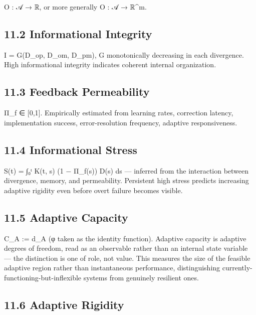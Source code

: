 \documentclass[
]{article}
\begin{document}
O : 𝒜 → ℝ, or more generally O : 𝒜 → ℝ\^{}m.

\hypertarget{informational-integrity-1}{%
\subsection{11.2 Informational
Integrity}\label{informational-integrity-1}}

I = G(D\_op, D\_om, D\_pm), G monotonically decreasing in each
divergence. High informational integrity indicates coherent internal
organization.

\hypertarget{feedback-permeability-1}{%
\subsection{11.3 Feedback Permeability}\label{feedback-permeability-1}}

Π\_f ∈ {[}0,1{]}. Empirically estimated from learning rates, correction
latency, implementation success, error-resolution frequency, adaptive
responsiveness.

\hypertarget{informational-stress-1}{%
\subsection{11.4 Informational Stress}\label{informational-stress-1}}

S(t) = ∫₀ᵗ K(t, s) (1 − Π\_f(s)) D(s) ds --- inferred from the
interaction between divergence, memory, and permeability. Persistent
high stress predicts increasing adaptive rigidity even before overt
failure becomes visible.

\hypertarget{adaptive-capacity}{%
\subsection{11.5 Adaptive Capacity}\label{adaptive-capacity}}

C\_A := d\_A (φ taken as the identity function). Adaptive capacity is
adaptive degrees of freedom, read as an observable rather than an
internal state variable --- the distinction is one of role, not value.
This measures the size of the feasible adaptive region rather than
instantaneous performance, distinguishing
currently-functioning-but-inflexible systems from genuinely resilient
ones.

\hypertarget{adaptive-rigidity-1}{%
\subsection{11.6 Adaptive Rigidity}\label{adaptive-rigidity-1}}
\end{document}
